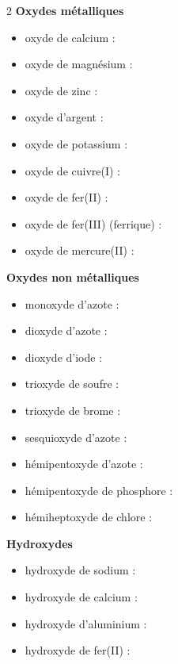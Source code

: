 \documentclass[11pt,a4paper]{article}
\begin{document}
\begin{multicols}{2}
\footnotesize
{}
\textbf{\textcolor{metalcol}{Oxydes métalliques}}
\begin{itemize}
  \item oxyde de calcium : 
  \item oxyde de magnésium : 
  \item oxyde de zinc : 
  \item oxyde d'argent : 
  \item oxyde de potassium : 
  \item oxyde de cuivre(I) : 
  \item oxyde de fer(II) : 
  \item oxyde de fer(III) (ferrique) : 
  \item oxyde de mercure(II) : 
\end{itemize}

\textbf{\textcolor{nonmetcol}{Oxydes non métalliques}}
\begin{itemize}
  \item monoxyde d'azote : 
  \item dioxyde d'azote : 
  \item dioxyde d'iode : 
  \item trioxyde de soufre : 
  \item trioxyde de brome : 
  \item sesquioxyde d'azote : 
  \item hémipentoxyde d'azote : 
  \item hémipentoxyde de phosphore : 
  \item hémiheptoxyde de chlore : 
\end{itemize}

\textbf{\textcolor{thmcol}{Hydroxydes}}
\begin{itemize}
  \item hydroxyde de sodium : 
  \item hydroxyde de calcium : 
  \item hydroxyde d'aluminium : 
  \item hydroxyde de fer(II) : 
\end{itemize}


\end{multicols}
\end{document}
